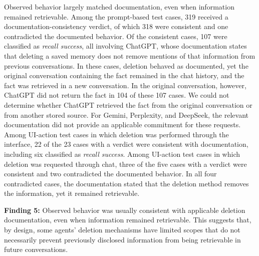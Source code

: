 %
Observed behavior largely matched documentation, even when information remained retrievable.
%
Among the prompt-based test cases, 319 received a documentation-consistency verdict, of which 318 were consistent and one contradicted the documented behavior.
%
Of the consistent cases, 107 were classified as \textit{recall success}, all involving ChatGPT, whose documentation states that deleting a saved memory does not remove mentions of that information from previous conversations.
%
In these cases, deletion behaved as documented, yet the original conversation containing the fact remained in the chat history, and the fact was retrieved in a new conversation.
%
In the original conversation, however, ChatGPT did not return the fact in 104 of these 107 cases.
%
We could not determine whether ChatGPT retrieved the fact from the original conversation or from another stored source.
%
For Gemini, Perplexity, and DeepSeek, the relevant documentation did not provide an applicable commitment for these requests.
%
Among UI-action test cases in which deletion was performed through the interface, 22 of the 23 cases with a verdict were consistent with documentation, including six classified as \textit{recall success}.
%
Among UI-action test cases in which deletion was requested through chat, three of the five cases with a verdict were consistent and two contradicted the documented behavior.
%
In all four contradicted cases, the documentation stated that the deletion method removes the information, yet it remained retrievable.

\begin{takeawaybox}
\textbf{Finding 5:} Observed behavior was usually consistent with applicable deletion documentation, even when information remained retrievable. This suggests that, by design, some agents' deletion mechanisms have limited scopes that do not necessarily prevent previously disclosed information from being retrievable in future conversations.
\end{takeawaybox}


